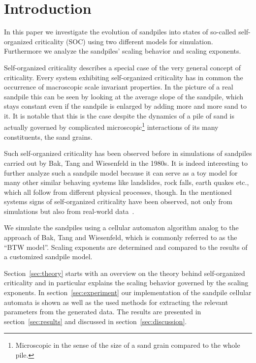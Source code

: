 \begin{abstract}
\dots\\
\dots\\
\dots%
\end{abstract}

\maketitle

\section{Introduction}
\label{sec:intro}
In this paper we investigate the evolution of sandpiles into states of so-called self-organized criticality (SOC) using
two different models for simulation. Furthermore we analyze the sandpiles' scaling behavior and scaling exponents.

Self-organized criticality describes a special case of the very general concept of criticality. Every system
exhibiting self-organized criticality has in common the occurrence of macroscopic scale invariant properties.
In the picture of a real sandpile this can be seen by looking at the average slope of the sandpile,
which stays constant even if the sandpile is enlarged by adding more and more sand to it.
It is notable that this is the case despite the dynamics of a pile of sand is actually governed by complicated
microscopic\footnote{Microscopic in the sense of the size of a sand grain compared to the whole pile.} interactions
of its many constituents, the sand grains.

Such self-organized criticality has been observed before in simulations of sandpiles carried out by Bak, Tang and
Wiesenfeld in the 1980s. It is indeed interesting to further analyze such a sandpile model
because it can serve as a toy model for many other similar behaving systems like landslides, rock falls, earth quakes
etc., which all follow from different physical processes, though.
In the mentioned systems signs of self-organized criticality have been observed, not only from simulations but also
from real-world data~\cite{Hergarten}.

We simulate the sandpiles using a cellular automaton algorithm analog to the approach of Bak, Tang and Wiesenfeld,
which is commonly referred to as the \enquote{BTW model}. Scaling exponents are determined and compared to the
results of a customized sandpile model.

Section~\ref{sec:theory} starts with an overview on the theory behind self-organized criticality and in particular
explains the scaling behavior governed by the scaling exponents.
In section~\ref{sec:experiment} our implementation of the sandpile cellular automata is shown as well as
the used methods for extracting the relevant parameters from the generated data.
The results are presented in section~\ref{sec:results} and discussed in section~\ref{sec:discussion}.


